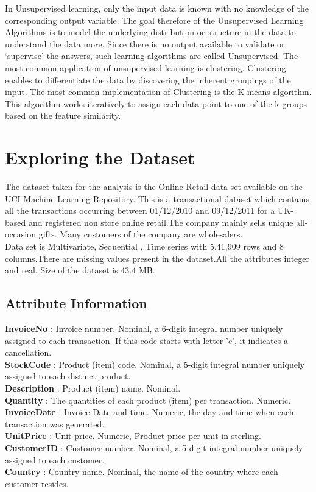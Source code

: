 In Unsupervised learning, only the input data is known with no knowledge of the corresponding output variable. The goal therefore of the Unsupervised Learning Algorithms is to model the underlying distribution or structure in the data to understand the data more. Since there is no output available to validate or `supervise' the answers, such learning algorithms are called Unsupervised. The most common application of unsupervised learning is clustering. Clustering enables to differentiate the data by discovering the inherent groupings of the input. The most common implementation of Clustering is the K-means algorithm. This algorithm works iteratively to assign each data point to one of the k-groups based on the feature similarity.

\section{Exploring the Dataset}

The dataset taken for the analysis is the Online Retail data set available on the UCI Machine Learning Repository. This is a transactional dataset which contains all the transactions occurring between 01/12/2010 and 09/12/2011 for a UK-based and registered non store online retail.The company mainly sells unique all-occasion gifts. Many customers of the company are wholesalers.\\

Data set is Multivariate, Sequential , Time series with 5,41,909 rows and 8 columns.There are missing values present in the dataset.All the attributes integer and real. Size of the dataset is 43.4 MB.\\

\subsection*{Attribute Information}

\textbf{InvoiceNo}    : Invoice number. Nominal, a 6-digit integral number uniquely assigned to each transaction. If this code starts with letter 'c', it indicates a cancellation. \\
\textbf{StockCode}    : Product (item) code. Nominal, a 5-digit integral number uniquely assigned to each distinct product.\\
\textbf{Description}  : Product (item) name. Nominal. \\
\textbf{Quantity}     : The quantities of each product (item) per transaction. Numeric.\\
\textbf{InvoiceDate}  : Invoice Date and time. Numeric, the day and time when each transaction was generated. \\
\textbf{UnitPrice}    : Unit price. Numeric, Product price per unit in sterling. \\
\textbf{CustomerID}   : Customer number. Nominal, a 5-digit integral number uniquely assigned to each customer.\\
\textbf{Country}      : Country name. Nominal, the name of the country where each customer resides.\\

